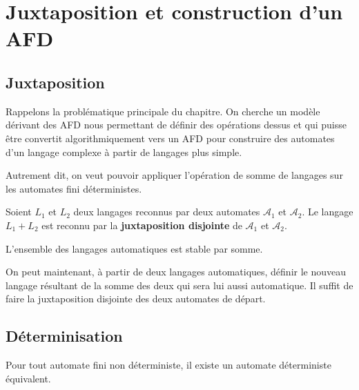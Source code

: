 
\section{Juxtaposition et construction d'un AFD}

\subsection{Juxtaposition}

Rappelons la problématique principale du chapitre. On cherche un modèle dérivant des AFD nous permettant de définir 
des opérations dessus et qui puisse être convertit algorithmiquement vers un AFD pour construire des automates 
d'un langage complexe à partir de langages plus simple. 

Autrement dit, on veut pouvoir appliquer l'opération de somme de langages sur les automates fini déterministes. 

\begin{definition}
    Soient $L_1$ et $L_2$ deux langages reconnus par deux automates $ \mathcal{A}_1$ et $ \mathcal{A}_2$. 
    Le langage $L_1 + L_2$ est reconnu par la \textbf{juxtaposition disjointe} de $ \mathcal{A}_1$ et $ \mathcal{A}_2$. 
\end{definition}

\begin{theorem}
    L'ensemble des langages automatiques est stable par somme. 
\end{theorem}

On peut maintenant, à partir de deux langages automatiques, définir le nouveau langage résultant de 
la somme des deux qui sera lui aussi automatique. Il suffit de faire la juxtaposition disjointe des deux automates
de départ. 

\subsection{Déterminisation}

\begin{theorem}
    Pour tout automate fini non déterministe, il existe un automate déterministe équivalent. 
\end{theorem}

